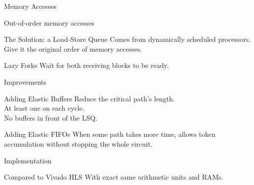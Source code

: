 \documentclass[page number]{beamer}
\begin{document}
\begin{frame}{Memory Accesses}
  \begin{alertblock}{Out-of-order memory accesses}
  \end{alertblock}
  \vfill
  \begin{exampleblock}{The Solution: a Load-Store Queue}
    Comes from dynamically scheduled processors.\\
    Give it the original order of memory accesses.
  \end{exampleblock}
  \vfill
  \begin{block}{Lazy Forks}
    Wait for both receiving blocks to be ready.
  \end{block}
    
\end{frame}

\begin{frame}{Improvements}
  \begin{block}{Adding Elastic Buffers}
    Reduce the critical path's length.\\
    At least one on each cycle.\\
    No buffers in front of the LSQ.
  \end{block}
  \vfill
  \begin{block}{Adding Elastic FIFOs}
    When some path takes more time, allows token accumulation without stopping the whole circuit.
  \end{block}
\end{frame}

\begin{frame}{Implementation}
  \vfill
  \begin{block}{Compared to Vivado HLS}
    With exact same arithmetic units and RAMs.
  \end{block}
    
\end{frame}
\end{document}
